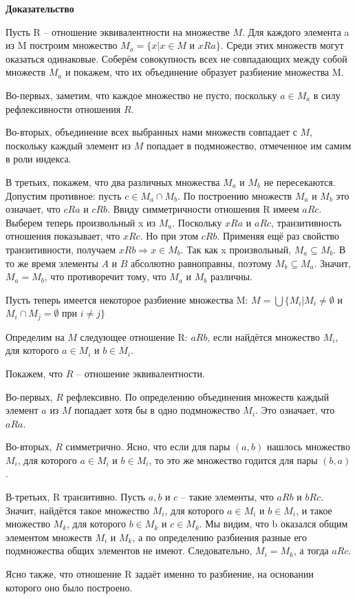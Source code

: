 \documentclass[a4paper]{article}
\begin{document}
    \begin{hproof}
        \textbf{Доказательство}

        Пусть R –
        отношение эквивалентности на множестве $M$. Для каждого элемента a из M построим множество $M_a = \{x | x \in M$ и $x R a\}$. Среди этих множеств могут
        оказаться одинаковые. Соберём совокупность всех не совпадающих между
        собой множеств $M_a$ и покажем, что их объединение образует разбиение множества M.

        Во-первых, заметим, что каждое множество не пусто, поскольку $a \in M_a$ в
        силу рефлексивности отношения $R$.

        Во-вторых, объединение всех выбранных нами множеств совпадает с $M$,
        поскольку каждый элемент из $M$ попадает в подмножество, отмеченное им
        самим в роли индекса.

        В третьих, покажем, что два различных множества $M_a$ и $M_b$ не пересекаются.
        Допустим противное: пусть $c \in M_a \cap M_b$. По построению множеств $M_a$ и $M_b$ это
        означает, что $c R a$ и $c R b$. Ввиду симметричности отношения R имеем $a R c$.
        Выберем теперь произвольный x из $M_a$. Поскольку $x R a$ и $a R c$, транзитивность
        отношения показывает, что $x R c$. Но при этом $c R b$. Применяя ещё раз свойство
        транзитивности, получаем $x R b \Rightarrow x \in M_b$. Так как x произвольный, $M_a \subseteq M_b$. В то же время элементы $A$ и $B$ абсолютно
        равноправны, поэтому $M_b \subseteq M_a$. Значит, $M_a = M_b$, что противоречит тому, что $M_a$ и $M_b$ различны.

        Пусть теперь имеется некоторое разбиение множества M:
        $M = \bigcup \{ M_i | M_i \neq \emptyset$ и $M_i \cap M_j = \emptyset$ при $i \neq j\}$

        Определим на $M$ следующее отношение R: $aRb$, если найдётся множество $M_i$, для которого $a \in M_i$ и $b \in M_i$.

        Покажем, что $R$ – отношение эквивалентности.

        Во-первых, $R$ рефлексивно. По определению объединения множеств каждый
        элемент $a$ из $M$ попадает хотя бы в одно подмножество $M_i$. Это означает, что
        $aRa$.

        Во-вторых, $R$ симметрично. Ясно, что если для пары $(a, b)$ нашлось
        множество $M_i$, для которого $a \in M_i$ и $b \in M_i$, то это же множество годится для
        пары $(b, a)$.

        В-третьих, R транзитивно. Пусть $a, b$ и $c$ – такие элементы, что $aRb$ и $bRc$.
        Значит, найдётся такое множество $M_i$, для которого $a \in M_i$ и $b \in M_i$, и такое
        множество $M_k$, для которого $b \in M_k$ и $c \in M_k$. Мы видим, что b оказался общим
        элементом множеств $M_i$ и $M_k$, а по определению разбиения разные его
        подмножества общих элементов не имеют. Следовательно, $M_i = M_k$, а тогда $aRc$.

        Ясно также, что отношение R задаёт именно то разбиение, на основании
        которого оно было построено.


    \end{hproof}
\end{document}
